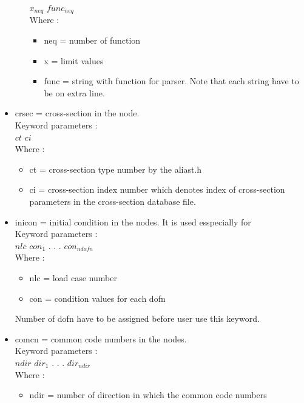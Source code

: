 \documentclass[12pt]{book}
\begin{document}
\begin{itemize}
\begin{itemize}
\begin {itemize}
                         $x_{neq}$ $func_{neq}$\\
               Where :
               \begin{itemize}
               \item neq = number of function
               \item x   = limit values
               \item func = string with function for parser. Note that each string
                      have to be on extra line.
               \end{itemize}
              \end{itemize} %
        \end{itemize} %
\item crsec = cross-section in the node.\\
        Keyword parameters :\\
        $ct$ $ci$\\
        Where :
        \begin{itemize}
        \item ct = cross-section type number by the aliast.h
        \item ci = cross-section index number which denotes index of
             cross-section parameters in the cross-section database file.
        \end{itemize}
\item inicon = initial condition in the nodes. It is used esspecially for\\
         Keyword parameters :\\
         $nlc$ $con_1$ . . . $con_{ndofn}$\\
         Where :
         \begin{itemize}
         \item nlc  = load case number
         \item con  = condition values for each dofn
         \end{itemize}
         Number of dofn have to be assigned before user use this keyword.
\item comcn = common code numbers in the nodes.\\
        Keyword parameters :\\
        $ndir$ $dir_1$ . . .  $dir_{ndir}$\\
        Where :
        \begin{itemize}
        \item ndir = number of direction in which the common code numbers

\end{itemize}
\end{itemize}
\end{document}
